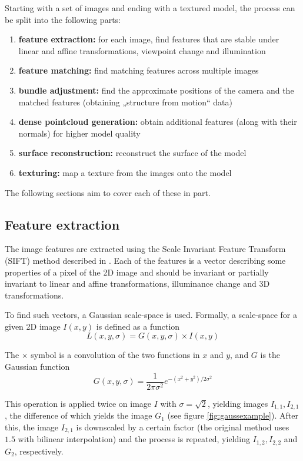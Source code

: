 Starting with a set of images and ending with a textured model, the process can be split into the following parts:

\begin{enumerate}
	\item \textbf{feature extraction:} for each image, find features that are stable under linear and affine transformations, viewpoint change and illumination
	\item \textbf{feature matching:} find matching features across multiple images
	\item \textbf{bundle adjustment:} find the approximate positions of the camera and the matched features (obtaining „structure from motion“ data)
	\item \textbf{dense pointcloud generation:} obtain additional features (along with their normals) for higher model quality
	\item \textbf{surface reconstruction:} reconstruct the surface of the model
	\item \textbf{texturing:} map a texture from the images onto the model
\end{enumerate}

The following sections aim to cover each of these in part.

\subsection{Feature extraction} \label{ch:fext}
The image features are extracted using the Scale Invariant Feature Transform (SIFT) method described in \citet{lowe1999object,lowe2004distinctive}.
Each of the features is a vector describing some properties of a pixel of the 2D image and should be invariant or partially invariant to linear and affine transformations, illuminance change and 3D transformations.

To find such vectors, a Gaussian scale-space is used.
Formally, a scale-space for a given 2D image $I(x, y)$ is defined as a function
\begin{equation} L(x, y, \sigma) = G(x, y, \sigma) \times I(x, y) \end{equation}

The $\times$ symbol is a convolution of the two functions in $x$ and $y$, and $G$ is the Gaussian function
\begin{equation}G(x, y, \sigma) = \frac{1}{2\pi \sigma^2} e^{-(x^2 + y^2) / 2\sigma^2}\end{equation}

This operation is applied twice on image $I$ with $\sigma = \sqrt{2}$, yielding images $I_{1,1}, I_{2,1}$, the difference of which yields the image $G_1$ (see figure \ref{fig:gaussexample}).
After this, the image $I_{2,1}$ is downscaled by a certain factor (the original method uses $1.5$ with bilinear interpolation) and the process is repeated, yielding $I_{1,2}, I_{2,2}$ and $G_2$, respectively.

